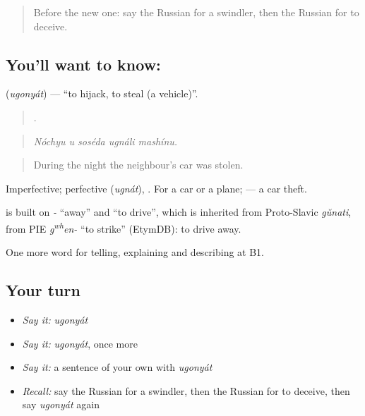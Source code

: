 \label{lesson:RU-C290-ugonyat}



\begin{quote}
Before the new one: say the Russian for a swindler, then the Russian for to deceive.
\end{quote}

\subsection*{You'll want to know: }
\textbf{} (\emph{ugonyát}) — \textquotedblleft{}to hijack, to steal (a vehicle)\textquotedblright{}.

\begin{quote}
    .
\end{quote}

\begin{quote}
\emph{Nóchyu u soséda ugnáli mashínu.}
\end{quote}

\begin{quote}
During the night the neighbour's car was stolen.
\end{quote}

Imperfective; perfective \emph{} (\emph{ugnát}), \emph{}. For a car or a plane; \emph{} — a car theft.

\begin{cousinweb}
\emph{} is built on \emph{-} \textquotedblleft{}away\textquotedblright{} and \emph{} \textquotedblleft{}to drive\textquotedblright{}, which is inherited from Proto-Slavic \emph{gŭnati}, from PIE \emph{g\textsuperscript{w}\textsuperscript{h}en-} \textquotedblleft{}to strike\textquotedblright{} (EtymDB): to drive away.
\end{cousinweb}

\begin{grammarlens}[title={What you've built}]
One more word for telling, explaining and describing at B1.
\end{grammarlens}

\subsection*{Your turn}
\begin{itemize}
\raggedright
  \item \emph{Say it:} \emph{ugonyát}
  \item \emph{Say it:} \emph{ugonyát}, once more
  \item \emph{Say it:} a sentence of your own with \emph{ugonyát}
  \item \emph{Recall:} say the Russian for a swindler, then the Russian for to deceive, then say \emph{ugonyát} again
\end{itemize}

